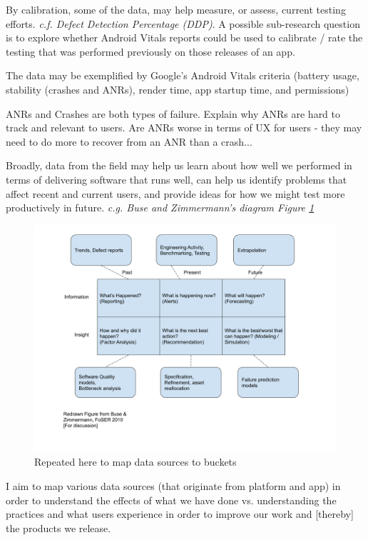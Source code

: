 By calibration, some of the data, may help measure, or assess, current testing efforts. \textit{c.f. Defect Detection Percentage (DDP)}. A possible sub-research question is to explore whether Android Vitals reports could be used to calibrate / rate the testing that was performed previously on those releases of an app.

The data may be exemplified by Google's Android Vitals criteria (battery usage, stability (crashes and ANRs), render time, app startup time, and permissions)\cite{play_console_help_android_vitals_2019}

ANRs and Crashes are both types of failure. Explain why ANRs are hard to track and relevant to users. Are ANRs worse in terms of UX for users - they may need to do more to recover from an ANR than a crash...

Broadly, data from the field may help us learn about how well we performed in terms of delivering software that runs well, can help us identify problems that affect recent and current users, and provide ideas for how we might test more productively in future. \textit{c.g. Buse and Zimmermann's diagram Figure \ref{fig:map_data_to_buckets}}

\begin{figure}
    \centering
    \includegraphics[width=\textwidth]{images/Buse_and_Zimmermann_2010_figure.png}
    \caption{Repeated here to map data sources to buckets}
    \label{fig:map_data_to_buckets}
\end{figure}

I aim to map various data sources (that originate from platform and app) in order to understand the effects of what we have done vs. understanding the practices and what users experience in order to improve our work and [thereby] the products we release.

